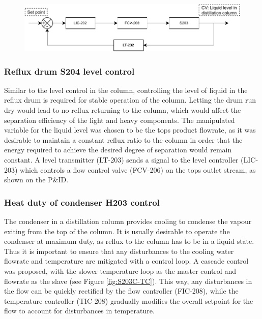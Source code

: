 \begin{figure}[H]
    \centering
    \includegraphics[width=\linewidth]{chapters/4-operation-control/4-Figures/S203-LC.pdf}
    \caption{}
    \label{fig:S203-LC}
\end{figure}


\subsubsection{Reflux drum S204 level control}
Similar to the level control in the column, controlling the level of liquid in the reflux drum is required for stable operation of the column. Letting the drum run dry would lead to no reflux returning to the column, which would affect the separation efficiency of the light and heavy components. The manipulated variable for the liquid level was chosen to be the tops product flowrate, as it was desirable to maintain a constant reflux ratio to the column in order that the energy required to achieve the desired degree of separation would remain constant. A level transmitter (LT-203) sends a signal to the level controller (LIC-203) which controls a flow control valve (FCV-206) on the tops outlet stream, as shown on the P\&ID. 


\subsubsection{Heat duty of condenser H203 control}
The condenser in a distillation column provides cooling to condense the vapour exiting from the top of the column. It is usually desirable to operate the condenser at maximum duty, as reflux to the column has to be in a liquid state. Thus it is important to ensure that any disturbances to the cooling water flowrate and temperature are mitigated with a control loop. A cascade control was proposed, with the slower temperature loop as the master control and flowrate as the slave (see Figure \ref{fig:S203C-TC}). This way, any disturbances in the flow can be quickly rectified by the flow controller (FIC-208), while the temperature controller (TIC-208) gradually modifies the overall setpoint for the flow to account for disturbances in temperature.

